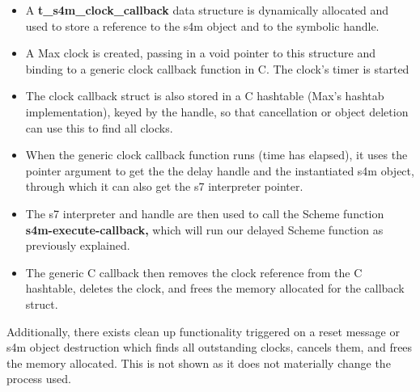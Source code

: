 \documentclass[acmsmall]{acmart}
\begin{document}
\begin{itemize}
\item A \textbf{t\_s4m\_clock\_callback} data structure is dynamically allocated and used to store a
  reference to the s4m object and to the symbolic handle.
\item A Max clock is created, passing in a void pointer to this structure
  and binding to a generic clock callback function in C. The clock's timer is started
\item The clock callback struct is also stored in a C hashtable (Max's hashtab implementation),
  keyed by the handle, so that cancellation or object deletion can use this to find all clocks.
\item When the generic clock callback function runs (time has elapsed), it uses the pointer argument to get the
  the delay handle and the instantiated s4m object, through which it 
  can also get the s7 interpreter pointer. 
\item The s7 interpreter and handle are then used to call the Scheme function
  \textbf{s4m-execute-callback,} which will run our delayed Scheme function as previously explained.
\item The generic C callback then removes the clock reference from the C hashtable,
  deletes the clock, and frees the memory allocated for the callback struct.
\end{itemize}

Additionally, there exists clean up functionality triggered on a reset message or 
s4m object destruction which finds all outstanding clocks, cancels them, and frees the memory allocated.
This is not shown as it does not materially change the process used.
\end{document}
